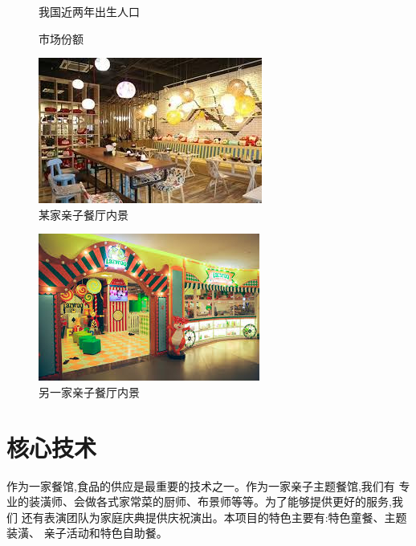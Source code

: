 \begin{figure}[ htbp ]
        \centering
        \caption{我国近两年出生人口}
        
\end{figure}
\begin{figure}[ htbp ]
        \centering
        \caption{市场份额}
        \label{figure:market-share}
        
\end{figure}
\begin{figure}[ htbp ]
        \centering
        \caption{某家亲子餐厅内景}
        \includegraphics{../images/interior/内景1}
\end{figure}
\begin{figure}[ htbp ]
        \centering
        \caption{另一家亲子餐厅内景}
        \includegraphics{../images/interior/内景2}
\end{figure}

\section{核心技术}
作为一家餐馆,食品的供应是最重要的技术之一。作为一家亲子主题餐馆,我们有
专业的装潢师、会做各式家常菜的厨师、布景师等等。为了能够提供更好的服务,我们
还有表演团队为家庭庆典提供庆祝演出。本项目的特色主要有:特色童餐、主题装潢、
亲子活动和特色自助餐。

